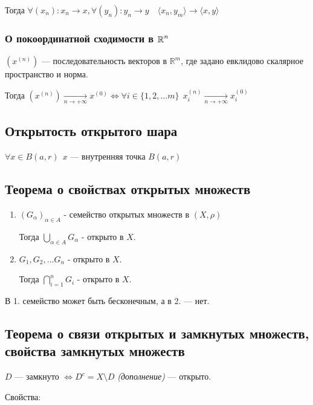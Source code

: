 Тогда $\forall (x_n) : x_n\to x, \forall (y_n) : y_n\to y \quad \langle x_n,y_m\rangle\to\langle x,y\rangle$

\subsubsection{О покоординатной сходимости в $\operatorname*{\mathbb{R}}^n$}

$(x^{(n)})$ --- последовательность векторов в $\mathbb{R}^m$, где задано евклидово скалярное пространство и норма.

Тогда $(x^{(n)})\underset{n\to+\infty}\to x^{(0)} \Leftrightarrow \forall i\in\{1,2,\ldots m\} \ \ x_i^{(n)}\underset{n\to+\infty}\to x_i^{(0)}$

\subsection{Открытость открытого шара}

$\forall x \in B(a, r) \ \ x$ --- внутренняя точка $B(a, r)$

\subsection{Теорема о свойствах открытых множеств}

\begin{enumerate}
    \item $(G_\alpha)_{\alpha\in A}$ - семейство открытых множеств в $(X,\rho)$
    
    Тогда $\bigcup\limits_{\alpha\in A} G_\alpha$ - открыто в $X$.

    \item $G_1,G_2,\ldots G_n$ - открыто в $X$.
    
    Тогда $\bigcap\limits_{i=1}^{n} G_i$ - открыто в $X$.
\end{enumerate}

\begin{remark}
    В 1. семейство может быть бесконечным, а в 2. --- нет.
\end{remark}

\subsection{Теорема о связи открытых и замкнутых множеств, свойства замкнутых множеств}

$D$ --- замкнуто $\Leftrightarrow D^c=X\setminus D$ \textit{(дополнение)} --- открыто.

Свойства:

